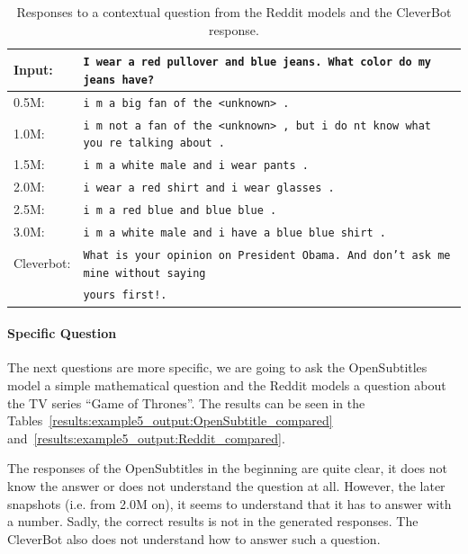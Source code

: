 \begin{table}[H]
	\centering
	\begin{adjustbox}{max width=\textwidth}
		\begin{tabular}{ll}
			\toprule
			Input: 	& \texttt{I wear a red pullover and blue jeans. What color do my jeans have?}\\
			\midrule
			0.5M: 	& \texttt{i m a big fan of the <unknown> .}\\
			1.0M: 	& \texttt{i m not a fan of the <unknown> , but i do nt know what you re talking about .}\\
			1.5M:	& \texttt{i m a white male and i wear pants .}\\
			2.0M:	& \texttt{i wear a red shirt and i wear glasses .}\\
			2.5M:	& \texttt{i m a red blue and blue blue .}\\
			3.0M:	& \texttt{i m a white male and i have a blue blue shirt .}\\
			Cleverbot:	& \texttt{What is your opinion on President Obama. And don't ask me mine without saying}\\
			& \texttt{yours first!.}\\
			\bottomrule
		\end{tabular}
	\end{adjustbox}
	\caption{Responses to a contextual question from the Reddit models and the CleverBot response.}
	\label{results:example4_output:Reddit_compared}
\end{table}

\paragraph{Specific Question}
The next questions are more specific, we are going to ask the OpenSubtitles model a simple mathematical question and the Reddit models a question about the TV series ``Game of Thrones''. The results can be seen in the Tables~\ref{results:example5_output:OpenSubtitle_compared} and~\ref{results:example5_output:Reddit_compared}.

The responses of the OpenSubtitles in the beginning are quite clear, it does not know the answer or does not understand the question at all. However, the later snapshots (i.e. from 2.0M on), it seems to understand that it has to answer with a number. Sadly, the correct results is not in the generated responses. The CleverBot also does not understand how to answer such a question.


